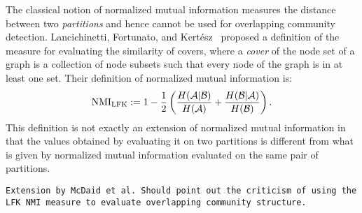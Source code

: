 The classical notion of normalized mutual information measures the distance  between 
two \emph{partitions} and hence cannot be used for overlapping community detection. 
Lancichinetti, Fortunato, and Kert\'{e}sz~\cite{LFK09} proposed a definition of the measure for 
evaluating the similarity of covers, where a \emph{cover} of the node set of a graph 
is a collection of node subsets such that every node of the graph is in at least one set. 
Their definition of normalized mutual information is:
\begin{equation} \label{eqn:nmi_LFK}
\mathrm{NMI}_{\mathrm{LFK}} := 1 - \frac{1}{2} 
		\left ( \frac{H(\mathcal{A} | \mathcal{B})}{H(\mathcal{A})} + \frac{H(\mathcal{B}
				| \mathcal{A})}{H(\mathcal{B})}\right ).
\end{equation}
This definition is not exactly an extension of normalized mutual information in that the values
obtained by evaluating it on two partitions is different from what is given by normalized mutual 
information evaluated on the same pair of partitions.

\texttt{Extension by McDaid et al. Should point out the criticism of using the LFK NMI measure 
to evaluate overlapping community structure.}
